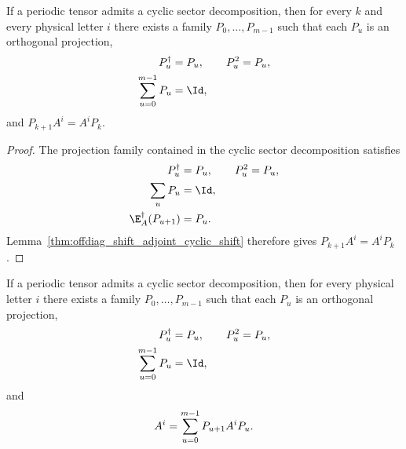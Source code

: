 \begin{lemma}
    \label{thm:cyclic_sector_offdiag_shift}
    \leanok
    If a periodic tensor admits a cyclic sector decomposition, then for every
    $k$ and every physical letter $i$ there exists a family
    $P_0,\ldots,P_{m-1}$ such that each $P_u$ is an orthogonal projection,
    \begin{align}
        P_u^\dagger         & =P_u,\qquad P_u^2=P_u, \notag \\
        \sum_{u=0}^{m-1}P_u & =\Id, \notag
    \end{align}
    and $P_{k+1}A^i=A^iP_k$.
\end{lemma}

\begin{proof}\leanok
    The projection family contained in the cyclic sector decomposition
    satisfies
    \begin{align}
        P_u^\dagger           & =P_u,\qquad P_u^2=P_u, \notag \\
        \sum_uP_u             & =\Id, \notag                  \\
        \E_A^\dagger(P_{u+1}) & =P_u. \notag
    \end{align}
    Lemma~\ref{thm:offdiag_shift_adjoint_cyclic_shift} therefore gives
    $P_{k+1}A^i=A^iP_k$.
\end{proof}

\begin{lemma}
    \label{thm:cyclic_sector_eq_sum_offdiag}
    \leanok
    If a periodic tensor admits a cyclic sector decomposition, then for every
    physical letter $i$ there exists a family $P_0,\ldots,P_{m-1}$ such that
    each $P_u$ is an orthogonal projection,
    \begin{align}
        P_u^\dagger         & =P_u,\qquad P_u^2=P_u, \notag \\
        \sum_{u=0}^{m-1}P_u & =\Id, \notag
    \end{align}
    and
    \begin{align}
        A^i=\sum_{u=0}^{m-1}P_{u+1}A^iP_u. \notag
    \end{align}
\end{lemma}

